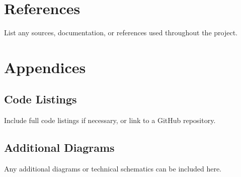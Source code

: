 \documentclass[twocolumn]{article}
\begin{document}
\section{References}
List any sources, documentation, or references used throughout the project.

\newpage
\onecolumn
\appendix
\section{Appendices}
\subsection{Code Listings}
Include full code listings if necessary, or link to a GitHub repository.

\subsection{Additional Diagrams}
Any additional diagrams or technical schematics can be included here.
\end{document}
